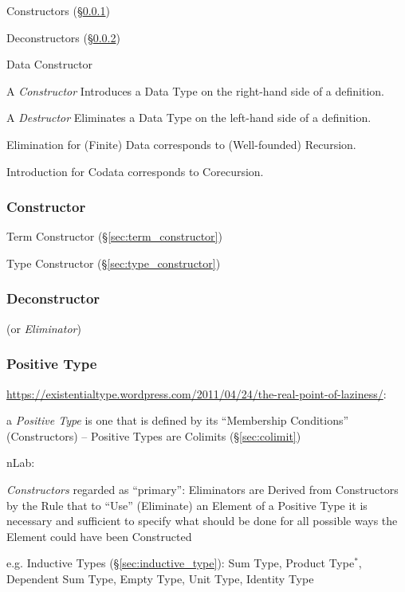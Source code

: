 Constructors (\S\ref{sec:constructor})

Deconstructors (\S\ref{sec:deconstructor})


\asterism


Data Constructor

A \emph{Constructor} Introduces a Data Type on the right-hand side of
a definition.

A \emph{Destructor} Eliminates a Data Type on the left-hand side of a
definition.

Elimination for (Finite) Data corresponds to (Well-founded)
Recursion.

Introduction for Codata corresponds to Corecursion.




\subsubsection{Constructor}\label{sec:constructor}

Term Constructor (\S\ref{sec:term_constructor})

Type Constructor (\S\ref{sec:type_constructor})



\subsubsection{Deconstructor}\label{sec:deconstructor}

(or \emph{Eliminator})



\subsubsection{Positive Type}\label{sec:positive_type}

\url{https://existentialtype.wordpress.com/2011/04/24/the-real-point-of-laziness/}:

a \emph{Positive Type} is one that is defined by its ``Membership
Conditions'' (Constructors) -- Positive Types are Colimits
(\S\ref{sec:colimit})

nLab:

\emph{Constructors} regarded as ``primary'': Eliminators are Derived
from Constructors by the Rule that to ``Use'' (Eliminate) an Element
of a Positive Type it is necessary and sufficient to specify what
should be done for all possible ways the Element could have been
Constructed

e.g. Inductive Types (\S\ref{sec:inductive_type}): Sum Type, Product
Type$^*$, Dependent Sum Type, Empty Type, Unit Type, Identity Type

